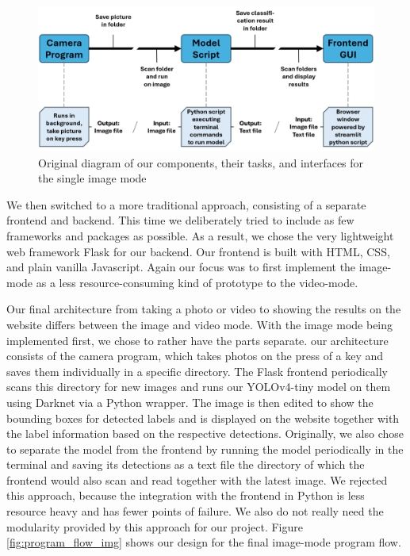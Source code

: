 \begin{figure}[H]
    \includegraphics[width=\textwidth]{figures/program_flow.png}
    \caption{Original diagram of our components, their tasks, and interfaces for the single image mode}
    \label{fig:program_flow}
\end{figure}

We then switched to a more traditional approach, consisting of a separate frontend and backend. This time we deliberately tried to include as few frameworks and packages as possible. As a result, we chose the very lightweight web framework Flask for our backend. Our frontend is built with HTML, CSS, and plain vanilla Javascript. Again our focus was to first implement the image-mode as a less resource-consuming kind of prototype to the video-mode.

Our final architecture from taking a photo or video to showing the results on the website differs between the image and video mode. With the image mode being implemented first, we chose to rather have the parts separate. our architecture consists of the camera program, which takes photos on the press of a key and saves them individually in a specific directory. The Flask frontend periodically scans this directory for new images and runs our YOLOv4-tiny model on them using Darknet via a Python wrapper. The image is then edited to show the bounding boxes for detected labels and is displayed on the website together with the label information based on the respective detections. 
Originally, we also chose to separate the model from the frontend by running the model periodically in the terminal and saving its detections as a text file the directory of which the frontend would also scan and read together with the latest image. We rejected this approach, because the integration with the frontend in Python is less resource heavy and has fewer points of failure. We also do not really need the modularity provided by this approach for our project. Figure \ref{fig:program_flow_img} shows our design for the final image-mode program flow.


